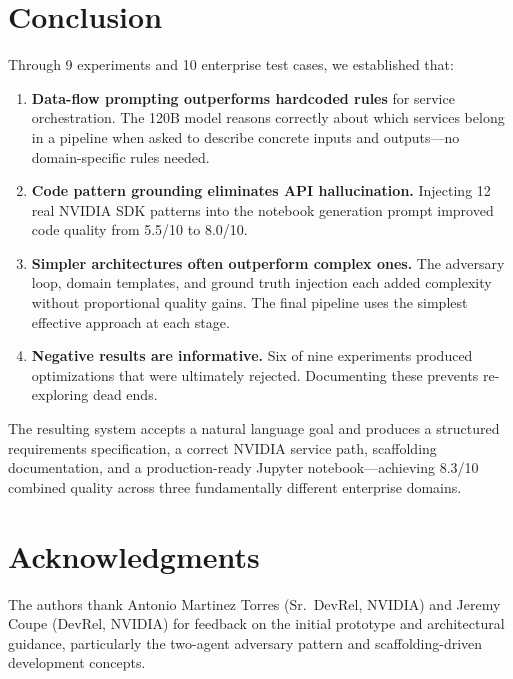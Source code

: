 \documentclass[conference]{IEEEtran}
\begin{document}
\section{Conclusion}

Through 9 experiments and 10 enterprise test cases, we established that:

\begin{enumerate}
    \item \textbf{Data-flow prompting outperforms hardcoded rules} for service orchestration. The 120B model reasons correctly about which services belong in a pipeline when asked to describe concrete inputs and outputs---no domain-specific rules needed.
    \item \textbf{Code pattern grounding eliminates API hallucination.} Injecting 12 real NVIDIA SDK patterns into the notebook generation prompt improved code quality from 5.5/10 to 8.0/10.
    \item \textbf{Simpler architectures often outperform complex ones.} The adversary loop, domain templates, and ground truth injection each added complexity without proportional quality gains. The final pipeline uses the simplest effective approach at each stage.
    \item \textbf{Negative results are informative.} Six of nine experiments produced optimizations that were ultimately rejected. Documenting these prevents re-exploring dead ends.
\end{enumerate}

The resulting system accepts a natural language goal and produces a structured requirements specification, a correct NVIDIA service path, scaffolding documentation, and a production-ready Jupyter notebook---achieving 8.3/10 combined quality across three fundamentally different enterprise domains.

\section*{Acknowledgments}

The authors thank Antonio Martinez Torres (Sr.~DevRel, NVIDIA) and Jeremy Coupe (DevRel, NVIDIA) for feedback on the initial prototype and architectural guidance, particularly the two-agent adversary pattern and scaffolding-driven development concepts.
\end{document}
